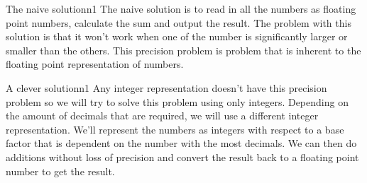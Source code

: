\documentclass{writeup}
\begin{document}
\begin{solutions}
  \begin{solution}{The naive solution}{n}{1}
    The naive solution is to read in all the numbers as floating point numbers, calculate the sum and output the result.
    The problem with this solution is that it won't work when one of the number is significantly larger or smaller than the others.
    This precision problem is problem that is inherent to the floating point representation of numbers.
  \end{solution}

  \begin{solution}{A clever solution}{n}{1}
    Any integer representation doesn't have this precision problem so we will try to solve this problem using only integers.
    Depending on the amount of decimals that are required, we will use a different integer representation.
    We'll represent the numbers as integers with respect to a base factor that is dependent on the number with the most decimals.
    We can then do additions without loss of precision and convert the result back to a floating point number to get the result.
  \end{solution}
\end{solutions}
\end{document}
